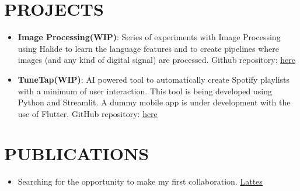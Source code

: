 \documentclass[letterpaper,11pt]{article}
\newcommand{\resumeItem}[1]{
  \item\small{
    {#1 \vspace{-1pt}}
  }
}
\newcommand{\resumeItemListStart}{\begin{itemize}[leftmargin=0.1in]}
\newcommand{\resumeItemListEnd}{\end{itemize}\vspace{-5pt}}
\begin{document}
\section{\color{airforceblue}PROJECTS}    
    \resumeItemListStart
        \vspace{0.5pt}
        
        \resumeItem{\normalsize{\textbf{Image Processing(WIP)}: Series of experiments with Image Processing using Halide to learn the language features and to create pipelines where images (and any kind of digital signal)  are processed. Github repository:}  \href{[https://github.com/kelvesc/Image-Processing-14051]}{\color{blue}\underline{here}}}
        \vspace{-5pt}
        
        \resumeItem{\normalsize{\textbf{TuneTap(WIP)}: AI powered tool to automatically create Spotify playlists with a minimum of user interaction. This tool is being developed using Python and Streamlit. A dummy mobile app is under development with the use of Flutter. GitHub repository:} \href{[https://github.com/kelvesc/Data-Analysis-PISI3-14342]}{\color{blue}\underline{here}}}
        \vspace{-5pt}
        

        
    \resumeItemListEnd  
   
\vspace{-8pt}
%

\section{\color{airforceblue}PUBLICATIONS}
    
  \resumeItemListStart
    
    \resumeItem{\normalsize{Searching for the opportunity to make my first collaboration.} \href{[http://lattes.cnpq.br/0278549043500928]}{\color{blue}\underline{Lattes}}}
    \vspace{-5pt}
%    
%
%    
  \resumeItemListEnd 
%      
\end{document}
